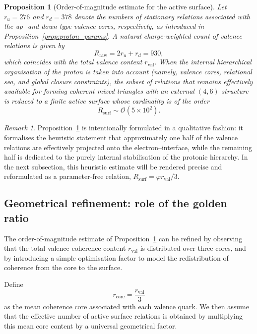 \documentclass[11pt,a4paper]{article}
\theoremstyle{plain}
\newtheorem{proposition}{Proposition}
\theoremstyle{definition}
\theoremstyle{remark}
\newtheorem{remark}{Remark}
\begin{document}
\begin{proposition}[Order-of-magnitude estimate for the active surface]
  \label{prop:Rsurf_order}
  Let \(r_u = 276\) and \(r_d = 378\) denote the numbers of stationary relations associated with the up- and down-type valence cores, respectively, as introduced in Proposition~\ref{prop:proton_params}. A natural charge-weighted count of valence relations is given by
  \[
    R_{\mathrm{raw}} = 2 r_u + r_d = 930,
  \]
  which coincides with the total valence content \(r_{\mathrm{val}}\). When the internal hierarchical organisation of the proton is taken into account (namely, valence cores, relational sea, and global closure constraints), the subset of relations that remains effectively available for forming coherent mixed triangles with an external \((4,6)\) structure is reduced to a finite active surface whose cardinality is of the order
  \[
    R_{\mathrm{surf}} \sim \mathcal{O}(5 \times 10^2).
  \]
\end{proposition}

\begin{remark}
  Proposition~\ref{prop:Rsurf_order} is intentionally formulated in a qualitative fashion: it formalises the heuristic statement that approximately one half of the valence relations are effectively projected onto the electron–interface, while the remaining half is dedicated to the purely internal stabilisation of the protonic hierarchy. In the next subsection, this heuristic estimate will be rendered precise and reformulated as a parameter-free relation,
  \(R_{\mathrm{surf}} = \varphi r_{\mathrm{val}}/3\).
\end{remark}

\subsection{Geometrical refinement: role of the golden ratio}

The order-of-magnitude estimate of Proposition~\ref{prop:Rsurf_order} can be refined by observing that the total valence coherence content \(r_{\mathrm{val}}\) is distributed over three cores, and by introducing a simple optimisation factor to model the redistribution of coherence from the core to the surface.

Define
\[
  r_{\mathrm{core}} = \frac{r_{\mathrm{val}}}{3}
\]
as the mean coherence core associated with each valence quark. We then assume that the effective number of active surface relations is obtained by multiplying this mean core content by a universal geometrical factor.
\end{document}
